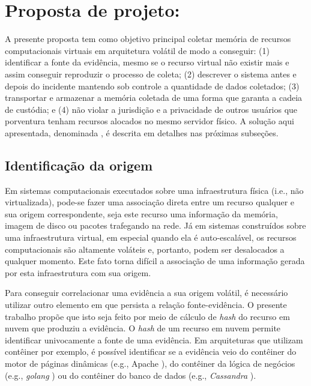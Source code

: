 \chapter{Proposta de projeto: \fancyname}
\label{chp:proposta}

A presente proposta tem como objetivo principal coletar memória de recursos computacionais virtuais em arquitetura volátil de modo a conseguir: 
(1) identificar a fonte da evidência, mesmo se o recurso virtual não existir mais e assim conseguir reproduzir o processo de coleta; 
(2) descrever o sistema antes e depois do incidente mantendo sob controle a quantidade de dados coletados;
(3) transportar e armazenar a memória coletada de uma forma que garanta a cadeia de custódia; e
(4) não violar a jurisdição e a privacidade de outros usuários que porventura tenham recursos alocados no mesmo servidor físico.
%
A solução aqui apresentada, denominada \fancyname, é descrita em detalhes nas próximas subseções.

\section{Identificação da origem}
\label{sec:proposal-desc-origin}

Em sistemas computacionais executados sobre uma infraestrutura física (i.e., não virtualizada), pode-se fazer uma associação direta entre um recurso qualquer e sua origem correspondente, seja este recurso uma informação da memória, imagem de disco ou pacotes trafegando na rede.
%
Já em sistemas construídos sobre uma infraestrutura virtual, em especial quando ela é auto-escalável, os recursos computacionais são altamente voláteis e, portanto, podem ser desalocados a qualquer momento.
%
Este fato torna difícil a associação de uma informação gerada por esta infraestrutura com sua origem.


Para conseguir correlacionar uma evidência a sua origem volátil, é necessário utilizar outro elemento em que persista a relação fonte-evidência.
%
O presente trabalho propõe que isto seja feito por meio de cálculo de \textit{hash} do recurso em nuvem que produziu a evidência. %
%
%
O \textit{hash} de um recurso em nuvem permite identificar univocamente a fonte de uma evidência. Em arquiteturas que utilizam contêiner por exemplo, é possível identificar se a evidência veio do contêiner do motor de páginas dinâmicas (e.g., Apache%
), do contêiner da lógica de negócios (e.g., \textit{golang}%
) ou do contêiner do banco de dados (e.g., \textit{Cassandra}%
). %


